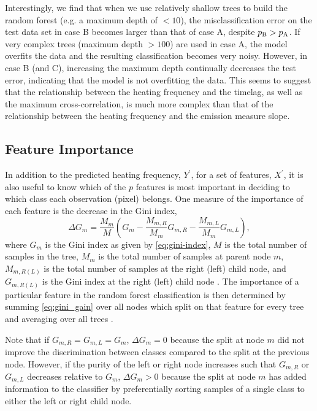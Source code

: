 Interestingly, we find that when we use relatively shallow trees to build the random forest (e.g. a maximum depth of $<10$), the misclassification error on the test data set in case B becomes larger than that of case A, despite $p_\textup{B}>p_\textup{A}$. If very complex trees (maximum depth $>100$) are used in case A, the model overfits the data and the resulting classification becomes very noisy. However, in case B (and C), increasing the maximum depth continually decreases the test error, indicating that the model is not overfitting the data. This seems to suggest that the relationship between the heating frequency and the timelag, as well as the maximum cross-correlation, is much more complex than that of the relationship between the heating frequency and the emission measure slope.

\subsection{Feature Importance}\label{sec:feature-importance}

In addition to the predicted heating frequency, $Y^\prime$, for a set of features, $X^\prime$, it is also useful to know which of the $p$ features is most important in deciding to which class each observation (pixel) belongs. One measure of the importance of each feature is the decrease in the Gini index,
\begin{equation}\label{eq:gini_gain}
    \Delta G_m = \frac{M_m}{M}\left( G_m - \frac{M_{m,R}}{M_m}G_{m,R} - \frac{M_{m,L}}{M_m}G_{m,L} \right),
\end{equation}
where $G_m$ is the Gini index as given by \autoref{eq:gini-index}, $M$ is the total number of samples in the tree, $M_m$ is the total number of samples at parent node $m$, $M_{m,R(L)}$ is the total number of samples at the right (left) child node, and $G_{m,R(L)}$ is the Gini index at the right (left) child node \citep{sandri_bias_2008}. The importance of a particular feature in the random forest classification is then determined by summing \autoref{eq:gini_gain} over all nodes which split on that feature for every tree and averaging over all trees \citep{breiman_classification_1984}.

Note that if $G_{m,R}=G_{m,L}=G_m$, $\Delta G_m=0$ because the split at node $m$ did not improve the discrimination between classes compared to the split at the previous node. However, if the purity of the left or right node increases such that $G_{m,R}$ or $G_{m,L}$ decreases relative to $G_m$, $\Delta G_m > 0$ because the split at node $m$ has added information to the classifier by preferentially sorting samples of a single class to either the left or right child node.


